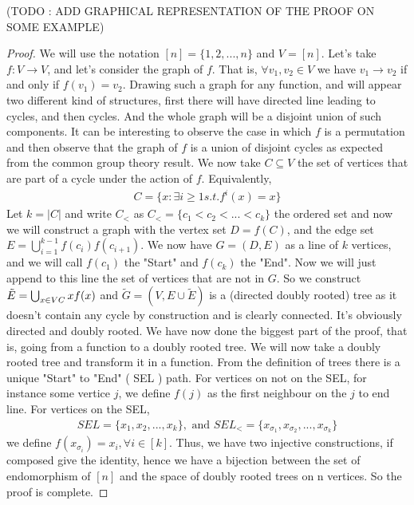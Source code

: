 (TODO : ADD GRAPHICAL REPRESENTATION OF THE PROOF ON SOME EXAMPLE)
\begin{proof}
We will use the notation $[n] = \{1, 2, ..., n\}$ and $V = [n]$.
Let's take $f:V \longrightarrow V$, and let's consider the graph of $f$. That is, $\forall v_1, v_2 \in V$ we have $v_1 \rightarrow v_2$ if and only if $f(v_1) = v_2$.
Drawing such a graph for any function, and will appear two different kind of structures, first there will have directed line leading to cycles, and then cycles. 
And the whole graph will be a disjoint union of such components.
It can be interesting to observe the case in which $f$ is a permutation and then observe that the graph of $f$ is a union of disjoint cycles as expected from the common group theory result.
\newline
We now take $C \subseteq V$ the set of vertices that are part of a cycle under the action of $f$. Equivalently,
\begin{align*}
    C = \{ x : \exists i \geq 1 s. t. f^i(x) = x \}
\end{align*}
Let $k = |C|$ and write $C_<$ as $C_< = \{c_1 < c_2 <...<c_k\}$ the ordered set and now we will construct a graph with the vertex set $D = f(C)$, and the edge set $E = \bigcup_{i=1}^{k-1} f(c_i)f(c_{i+1})$. We now have $G=(D, E)$ as a line of $k$ vertices, and we will call $f(c_1)$ the "Start" and $f(c_k)$ the "End".
\newline
Now we will just append to this line the set of vertices that are not in $G$. So we construct $\tilde{E} = \bigcup_{x \in V\\C} x f(x)$ and $\tilde{G} = (V, E\cup\tilde{E})$ is a (directed doubly rooted) tree as it doesn't contain any cycle by construction and is clearly connected. It's obviously directed and  doubly rooted.
We have now done the biggest part of the proof, that is, going from a function to a doubly rooted tree.
\newline
We will now take a doubly rooted tree and transform it in a function. From the definition of trees there is a unique "Start" to "End" ( SEL ) path.
\newline
For vertices on not on the SEL, for instance some vertice $j$, we define $f(j)$ as the first neighbour on the $j$ to end line.
\newline
For vertices on the SEL, 
\begin{align}
    SEL = \{x_1, x_2, ..., x_k\}, \text{ and } SEL_< = \{x_{\sigma_1}, x_{\sigma_2}, ..., x_{\sigma_k}\} 
\end{align}
we define $f(x_{\sigma_i}) = x_i, \forall i \in [k]$.
\newline
Thus, we have two injective constructions, if composed give the identity, hence we have a bijection between the set of endomorphism of $[n]$ and the space of doubly rooted trees on n vertices. So the proof is complete.
\end{proof}
